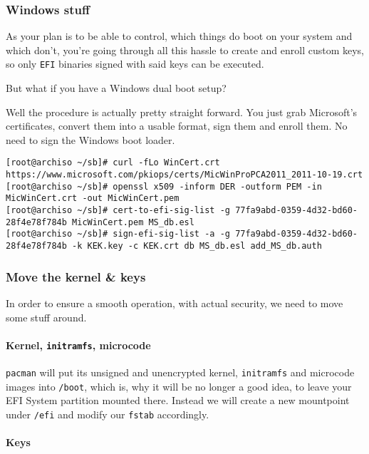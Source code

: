 \documentclass[10pt]{dustdoc}
\begin{document}
\subsubsection{Windows stuff}
\label{sec:windows-stuff}

As your plan is to be able to control, which things do boot on your system and which don’t, you’re going through all this hassle to create and enroll custom keys, so only \texttt{EFI} binaries signed with said keys can be executed.

But what if you have a Windows dual boot setup?

Well the procedure is actually pretty straight forward.
You just grab Microsoft’s certificates, convert them into a usable format, sign them and enroll them.
No need to sign the Windows boot loader.

\begin{verbatim}
[root@archiso ~/sb]# curl -fLo WinCert.crt https://www.microsoft.com/pkiops/certs/MicWinProPCA2011_2011-10-19.crt
[root@archiso ~/sb]# openssl x509 -inform DER -outform PEM -in MicWinCert.crt -out MicWinCert.pem
[root@archiso ~/sb]# cert-to-efi-sig-list -g 77fa9abd-0359-4d32-bd60-28f4e78f784b MicWinCert.pem MS_db.esl
[root@archiso ~/sb]# sign-efi-sig-list -a -g 77fa9abd-0359-4d32-bd60-28f4e78f784b -k KEK.key -c KEK.crt db MS_db.esl add_MS_db.auth
\end{verbatim}

\subsubsection{Move the kernel \& keys}
\label{sec:move-the-kernel-and-keys}

In order to ensure a smooth operation, with actual security, we need to move some stuff around.

\paragraph{Kernel, \texttt{initramfs}, microcode}
\label{par:kernel-initramfs-microcode}

\texttt{pacman} will put its unsigned and unencrypted kernel, \texttt{initramfs} and microcode images into \texttt{/boot}, which is, why it will be no longer a good idea, to leave your EFI System partition mounted there.
Instead we will create a new mountpoint under \texttt{/efi} and modify our \texttt{fstab} accordingly.

\paragraph{Keys}
\label{par:keys}
\end{document}
